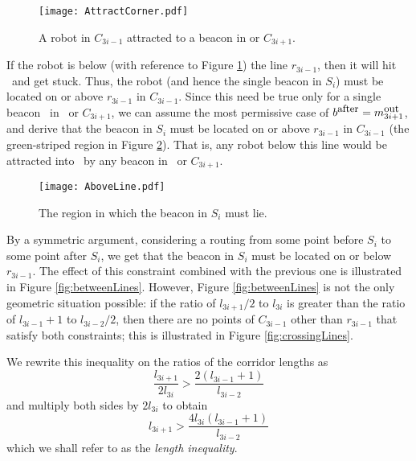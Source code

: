 \documentclass{article}
\begin{document}
\begin{figure}[htbp] 
	\begin{center}
		\texttt{[image: AttractCorner.pdf]} 
	\end{center}
	\caption{ 
		A robot in $C_{3i-1}$ attracted to a beacon in  or 
		$C_{3i+1}$.
	}\label{fig:attractCorner}
\end{figure}

If the robot is below (with reference to Figure \ref{fig:attractCorner})
the line \bafter$r_{3i-1}$, then it will hit \ebad\ and get stuck.
Thus, the robot (and hence the single beacon in $S_i$) must be located
on or above \bafter$r_{3i-1}$ in $C_{3i-1}$.
Since this need be true only for a single beacon \bafter\ in \ or
$C_{3i+1}$, we can assume the most permissive case of $b^{\mbox{\small after}} = m_{3i+1}^{\mbox{\small out}}$,
and derive that the beacon in $S_i$ must be located on or above
\mipout$r_{3i-1}$ in $C_{3i-1}$ (the green-striped region in Figure
\ref{fig:aboveLine}).
That is, any robot below this line would be attracted into \ebad\ by any beacon
in \ or $C_{3i+1}$.

\begin{figure}[htbp] 
	\begin{center}
		\texttt{[image: AboveLine.pdf]} 
	\end{center}
	\caption{The region in which the beacon in $S_i$ must lie.}
	\label{fig:aboveLine}
\end{figure}

By a symmetric argument, considering a routing from some point before $S_i$ to
some point after $S_i$, we get that the beacon in $S_i$ must be located on or
below \mimout$r_{3i-1}$.  The effect of this constraint combined with the
previous one is illustrated in Figure \ref{fig:betweenLines}.
However, Figure \ref{fig:betweenLines} is not the only geometric situation
possible:
if the ratio of $l_{3i+1}/2$ to $l_{3i}$ is greater than the ratio of
$l_{3i-1}+1$ to $l_{3i-2}/2$, then there are no points of $C_{3i-1}$ other than
$r_{3i-1}$ that satisfy both constraints; this is illustrated in Figure
\ref{fig:crossingLines}.

We rewrite this inequality on the ratios of the corridor lengths as
	\[
		\frac{l_{3i+1}}{2l_{3i}} > \frac{2(l_{3i-1}+1)}{l_{3i-2}}
	\]
and multiply both sides by $2l_{3i}$ to obtain
	\[
		l_{3i+1} > \frac{4 l_{3i} (l_{3i-1}+1)}{l_{3i-2}}
	\]
which we shall refer to as the \emph{length inequality}.
\end{document}
